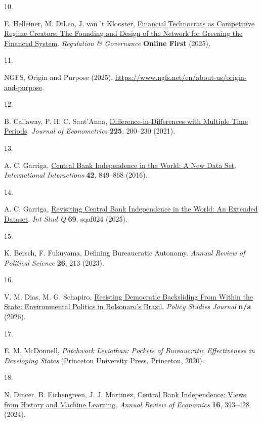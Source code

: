 \documentclass[
  12pt,
  letterpaper,
]{article}
\newlength{\cslhangindent}
\newlength{\csllabelwidth}
\newenvironment{CSLReferences}[2] %
 {\begin{list}{}{%
  \setlength{\itemindent}{0pt}
  \setlength{\leftmargin}{0pt}
  \setlength{\parsep}{0pt}
  \ifodd #1
   \setlength{\leftmargin}{\cslhangindent}
   \setlength{\itemindent}{-1\cslhangindent}
  \fi
  \setlength{\itemsep}{#2\baselineskip}}}
 {\end{list}}
\newcommand{\CSLLeftMargin}[1]{\parbox[t]{\csllabelwidth}{\strut#1\strut}}
\newcommand{\CSLRightInline}[1]{\parbox[t]{\linewidth - \csllabelwidth}{\strut#1\strut}}
\begin{document}
\begin{CSLReferences}{0}{1}
\CSLLeftMargin{10. }%
\CSLRightInline{E. Helleiner, M. DiLeo, J. van 't Klooster,
\href{https://doi.org/10.1111/rego.12629}{Financial {Technocrats} as
{Competitive Regime Creators}: {The Founding} and {Design} of the
{Network} for {Greening} the {Financial System}}. \emph{Regulation \&
Governance} \textbf{Online First} (2025).}

\CSLLeftMargin{11. }%
\CSLRightInline{NGFS, Origin and {Purpose} (2025).
\url{https://www.ngfs.net/en/about-us/origin-and-purpose}.}

\CSLLeftMargin{12. }%
\CSLRightInline{B. Callaway, P. H. C. Sant'Anna,
\href{https://doi.org/10.1016/j.jeconom.2020.12.001}{Difference-in-{Differences}
with {Multiple Time Periods}}. \emph{Journal of Econometrics}
\textbf{225}, 200--230 (2021).}

\CSLLeftMargin{13. }%
\CSLRightInline{A. C. Garriga,
\href{https://doi.org/10.1080/03050629.2016.1188813}{Central {Bank
Independence} in the {World}: {A New Data Set}}. \emph{International
Interactions} \textbf{42}, 849--868 (2016).}

\CSLLeftMargin{14. }%
\CSLRightInline{A. C. Garriga,
\href{https://doi.org/10.1093/isq/sqaf024}{Revisiting {Central Bank
Independence} in the {World}: {An Extended Dataset}}. \emph{Int Stud Q}
\textbf{69}, sqaf024 (2025).}

\CSLLeftMargin{15. }%
\CSLRightInline{K. Bersch, F. Fukuyama, Defining {Bureaucratic
Autonomy}. \emph{Annual Review of Political Science} \textbf{26}, 213
(2023).}

\CSLLeftMargin{16. }%
\CSLRightInline{V. M. Dias, M. G. Schapiro,
\href{https://doi.org/10.1111/psj.70101}{Resisting {Democratic
Backsliding From Within} the {State}: {Environmental Politics} in
{Bolsonaro}'s {Brazil}}. \emph{Policy Studies Journal} \textbf{n/a}
(2026).}

\CSLLeftMargin{17. }%
\CSLRightInline{E. M. McDonnell, \emph{Patchwork {Leviathan}: {Pockets}
of {Bureaucratic Effectiveness} in {Developing States}} (Princeton
University Press, Princeton, 2020).}

\CSLLeftMargin{18. }%
\CSLRightInline{N. Dincer, B. Eichengreen, J. J. Martinez,
\href{https://doi.org/10.1146/annurev-economics-081623-032553}{Central
{Bank Independence}: {Views} from {History} and {Machine Learning}}.
\emph{Annual Review of Economics} \textbf{16}, 393--428 (2024).}


\end{CSLReferences}
\end{document}
